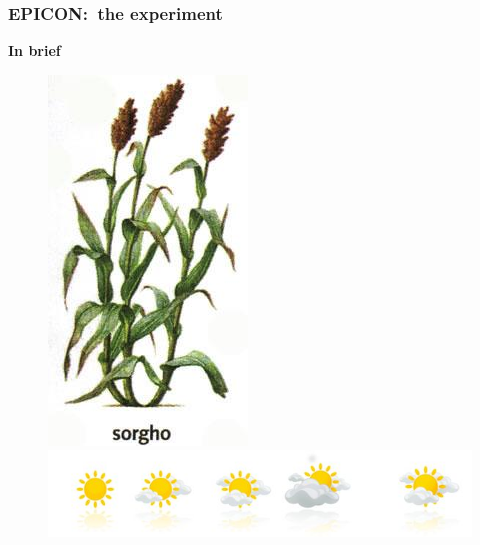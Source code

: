 \documentclass[xcolor=dvipsnames]{beamer}
\begin{document}
\begin{frame}
\frametitle{EPICON:\ the experiment}

\textbf{\color{Blue} In brief}\\
\begin{figure}
\centering
\begin{minipage}{0.15\textwidth}
\begin{flushright}
\includegraphics[width=0.8\linewidth]{images/sorghum.png}
\end{flushright}
\end{minipage}
\begin{minipage}{0.5\textwidth}
\begin{center}
\includegraphics[width=0.8\linewidth]{images/drought.png}

\end{center}
\end{minipage}
\end{figure}
\end{frame}
\end{document}
